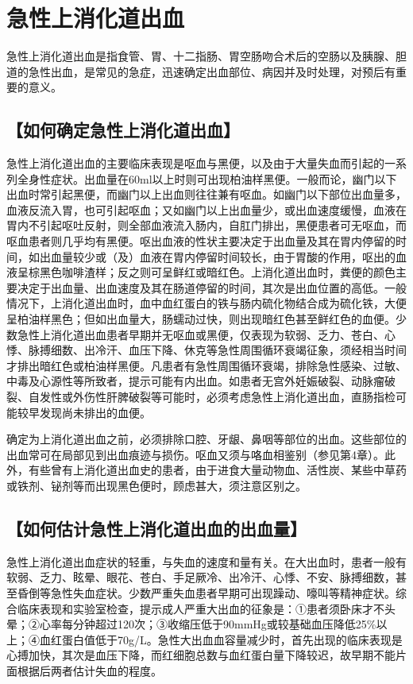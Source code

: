 \chapter{急性上消化道出血}

急性上消化道出血是指食管、胃、十二指肠、胃空肠吻合术后的空肠以及胰腺、胆道的急性出血，是常见的急症，迅速确定出血部位、病因并及时处理，对预后有重要的意义。

\section{【如何确定急性上消化道出血】}

急性上消化道出血的主要临床表现是呕血与黑便，以及由于大量失血而引起的一系列全身性症状。出血量在60ml以上时则可出现柏油样黑便。一般而论，幽门以下出血时常引起黑便，而幽门以上出血则往往兼有呕血。如幽门以下部位出血量多，血液反流入胃，也可引起呕血；又如幽门以上出血量少，或出血速度缓慢，血液在胃内不引起呕吐反射，则全部血液流入肠内，自肛门排出，黑便患者可无呕血，而呕血患者则几乎均有黑便。呕出血液的性状主要决定于出血量及其在胃内停留的时间，如出血量较少或（及）血液在胃内停留时间较长，由于胃酸的作用，呕出的血液呈棕黑色咖啡渣样；反之则可呈鲜红或暗红色。上消化道出血时，粪便的颜色主要决定于出血量、出血速度及其在肠道停留的时间，其次是出血位置的高低。一般情况下，上消化道出血时，血中血红蛋白的铁与肠内硫化物结合成为硫化铁，大便呈柏油样黑色；但如出血量大，肠蠕动过快，则出现暗红色甚至鲜红色的血便。少数急性上消化道出血患者早期并无呕血或黑便，仅表现为软弱、乏力、苍白、心悸、脉搏细数、出冷汗、血压下降、休克等急性周围循环衰竭征象，须经相当时间才排出暗红色或柏油样黑便。凡患者有急性周围循环衰竭，排除急性感染、过敏、中毒及心源性等所致者，提示可能有内出血。如患者无宫外妊娠破裂、动脉瘤破裂、自发性或外伤性肝脾破裂等可能时，必须考虑急性上消化道出血，直肠指检可能较早发现尚未排出的血便。

确定为上消化道出血之前，必须排除口腔、牙龈、鼻咽等部位的出血。这些部位的出血常可在局部见到出血痕迹与损伤。呕血又须与咯血相鉴别（参见第4章）。此外，有些曾有上消化道出血史的患者，由于进食大量动物血、活性炭、某些中草药或铁剂、铋剂等而出现黑色便时，顾虑甚大，须注意区别之。

\section{【如何估计急性上消化道出血的出血量】}

急性上消化道出血症状的轻重，与失血的速度和量有关。在大出血时，患者一般有软弱、乏力、眩晕、眼花、苍白、手足厥冷、出冷汗、心悸、不安、脉搏细数，甚至昏倒等急性失血症状。少数严重失血患者早期可出现躁动、嚎叫等精神症状。综合临床表现和实验室检查，提示成人严重大出血的征象是：①患者须卧床才不头晕；②心率每分钟超过120次；③收缩压低于90mmHg或较基础血压降低25\%以上；④血红蛋白值低于70g/L。急性大出血血容量减少时，首先出现的临床表现是心搏加快，其次是血压下降，而红细胞总数与血红蛋白量下降较迟，故早期不能片面根据后两者估计失血的程度。

